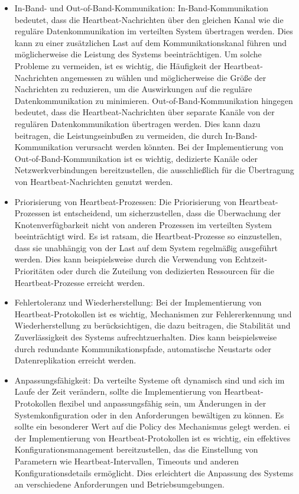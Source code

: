 \begin{itemize} 
\item In-Band- und Out-of-Band-Kommunikation: In-Band-Kommunikation bedeutet, dass die Heartbeat-Nachrichten über den gleichen Kanal wie die reguläre Datenkommunikation im verteilten System übertragen werden. Dies kann zu einer zusätzlichen Last auf dem Kommunikationskanal führen und möglicherweise die Leistung des Systems beeinträchtigen. Um solche Probleme zu vermeiden, ist es wichtig, die Häufigkeit der Heartbeat-Nachrichten angemessen zu wählen und möglicherweise die Größe der Nachrichten zu reduzieren, um die Auswirkungen auf die reguläre Datenkommunikation zu minimieren. Out-of-Band-Kommunikation hingegen bedeutet, dass die Heartbeat-Nachrichten über separate Kanäle von der regulären Datenkommunikation übertragen werden. Dies kann dazu beitragen, die Leistungseinbußen zu vermeiden, die durch In-Band-Kommunikation verursacht werden könnten. Bei der Implementierung von Out-of-Band-Kommunikation ist es wichtig, dedizierte Kanäle oder Netzwerkverbindungen bereitzustellen, die ausschließlich für die Übertragung von Heartbeat-Nachrichten genutzt werden.
\item Priorisierung von Heartbeat-Prozessen: Die Priorisierung von Heartbeat-Prozessen ist entscheidend, um sicherzustellen, dass die Überwachung der Knotenverfügbarkeit nicht von anderen Prozessen im verteilten System beeinträchtigt wird. Es ist ratsam, die Heartbeat-Prozesse so einzustellen, dass sie unabhängig von der Last auf dem System regelmäßig ausgeführt werden. Dies kann beispielsweise durch die Verwendung von Echtzeit-Prioritäten oder durch die Zuteilung von dedizierten Ressourcen für die Heartbeat-Prozesse erreicht werden.
\item Fehlertoleranz und Wiederherstellung: Bei der Implementierung von Heartbeat-Protokollen ist es wichtig, Mechanismen zur Fehlererkennung und Wiederherstellung zu berücksichtigen, die dazu beitragen, die Stabilität und Zuverlässigkeit des Systems aufrechtzuerhalten. Dies kann beispielsweise durch redundante Kommunikationspfade, automatische Neustarts oder Datenreplikation erreicht werden.
\item Anpassungsfähigkeit: Da verteilte Systeme oft dynamisch sind und sich im Laufe der Zeit verändern, sollte die Implementierung von Heartbeat-Protokollen flexibel und anpassungsfähig sein, um Änderungen in der Systemkonfiguration oder in den Anforderungen bewältigen zu können. Es sollte ein besonderer Wert auf die Policy des Mechanismus gelegt werden. ei der Implementierung von Heartbeat-Protokollen ist es wichtig, ein effektives Konfigurationsmanagement bereitzustellen, das die Einstellung von Parametern wie Heartbeat-Intervallen, Timeouts und anderen Konfigurationsdetails ermöglicht. Dies erleichtert die Anpassung des Systems an verschiedene Anforderungen und Betriebsumgebungen.

\end{itemize}
